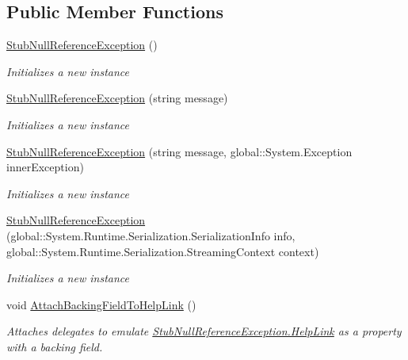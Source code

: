 \subsection*{Public Member Functions}
\begin{DoxyCompactItemize}
\item 
\hyperlink{class_system_1_1_fakes_1_1_stub_null_reference_exception_a135c8d68791788b2ba679e9f8c42a5d6}{Stub\-Null\-Reference\-Exception} ()
\begin{DoxyCompactList}\small\item\em Initializes a new instance\end{DoxyCompactList}\item 
\hyperlink{class_system_1_1_fakes_1_1_stub_null_reference_exception_a3f4df8fb335e2cb7e455db86786d7e64}{Stub\-Null\-Reference\-Exception} (string message)
\begin{DoxyCompactList}\small\item\em Initializes a new instance\end{DoxyCompactList}\item 
\hyperlink{class_system_1_1_fakes_1_1_stub_null_reference_exception_aa07747e05ad711ecebe86f693eb11a9c}{Stub\-Null\-Reference\-Exception} (string message, global\-::\-System.\-Exception inner\-Exception)
\begin{DoxyCompactList}\small\item\em Initializes a new instance\end{DoxyCompactList}\item 
\hyperlink{class_system_1_1_fakes_1_1_stub_null_reference_exception_ac63484ee7f05283487780d86f0656208}{Stub\-Null\-Reference\-Exception} (global\-::\-System.\-Runtime.\-Serialization.\-Serialization\-Info info, global\-::\-System.\-Runtime.\-Serialization.\-Streaming\-Context context)
\begin{DoxyCompactList}\small\item\em Initializes a new instance\end{DoxyCompactList}\item 
void \hyperlink{class_system_1_1_fakes_1_1_stub_null_reference_exception_a9f364e99c83820d27202b69e009aa5b0}{Attach\-Backing\-Field\-To\-Help\-Link} ()
\begin{DoxyCompactList}\small\item\em Attaches delegates to emulate \hyperlink{class_system_1_1_fakes_1_1_stub_null_reference_exception_acfa235d720d56f027c6fb55fc242e8fb}{Stub\-Null\-Reference\-Exception.\-Help\-Link} as a property with a backing field.\end{DoxyCompactList}\item 

\end{DoxyCompactItemize}
